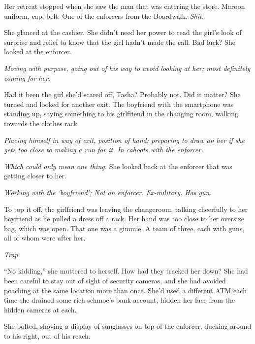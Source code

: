 Her retreat stopped when she saw the man that was entering the store.  Maroon uniform, cap, belt.  One of the enforcers from the Boardwalk.  \emph{Shit.}



She glanced at the cashier.  She didn't need her power to read the girl's look of surprise and relief to know that the girl hadn't made the call.  Bad luck?  She looked at the enforcer.



\emph{Moving with purpose, going out of his way to avoid looking at her; most definitely coming for her.}



Had it been the girl she'd scared off, Tasha?  Probably not.  Did it matter?  She turned and looked for another exit.  The boyfriend with the smartphone was standing up, saying something to his girlfriend in the changing room, walking towards the clothes rack.



\emph{Placing himself in way of exit, position of hand; preparing to draw on her if she gets too close to making a run for it.  In cahoots with the enforcer.}



\emph{Which could only mean one thing.}  She looked back at the enforcer that was getting closer to her.



\emph{Working with the `boyfriend'; Not an enforcer.  Ex-military.  Has gun.}



To top it off, the girlfriend was leaving the changeroom, talking cheerfully to her boyfriend as he pulled a dress off a rack.  Her hand was too close to her oversize bag, which was open.  That one was a gimmie.  A team of three, each with guns, all of whom were after her.



\emph{Trap.}



``No kidding,'' she muttered to herself.  How had they tracked her down?  She had been careful to stay out of sight of security cameras, and she had avoided poaching at the same location more than once.  She'd used a different ATM each time she drained some rich schmoe's bank account, hidden her face from the hidden cameras at each.



She bolted, shoving a display of sunglasses on top of the enforcer, ducking around to his right, out of his reach.



